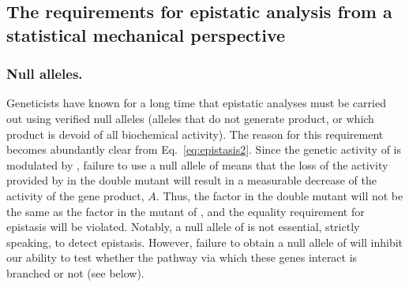 %

\subsection*{The requirements for epistatic analysis from a statistical
             mechanical perspective}
\subsubsection*{Null alleles.}
Geneticists have known for a long time that epistatic analyses must be carried
out using verified null alleles (alleles that do not generate product, or which
product is devoid of all biochemical activity). The reason for this requirement
becomes abundantly clear from Eq.~\ref{eq:epistasis2}. Since the genetic
activity of  is modulated by , failure to use a null allele of
 means that the loss of the activity provided by  in the double
mutant will result in a measurable decrease of the activity of the gene product,
\(A\). Thus, the \Freg{} factor in the double mutant will not be the same as the
\Freg{} factor in the mutant of , and the equality requirement for
epistasis will be violated. Notably, a null allele of  is not essential,
strictly speaking, to detect epistasis. However, failure to obtain a null allele
of  will inhibit our ability to test whether the pathway via which these
genes interact is branched or not (see below).

